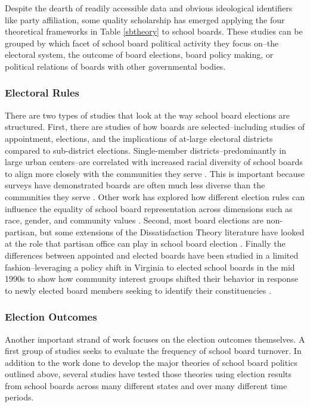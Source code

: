 Despite the dearth of readily accessible data and obvious ideological identifiers like party affiliation, some quality scholarship has emerged applying the four theoretical frameworks in Table \ref{sbtheory} to school boards. These studies can be grouped by which facet of school board political activity they focus on--the electoral system, the outcome of board elections, board policy making, or political relations of boards with other governmental bodies. 

\subsubsection{Electoral Rules}
There are two types of studies that look at the way school board elections are structured. First, there are studies of how boards are selected--including studies of appointment, elections, and the implications of at-large electoral districts compared to sub-district elections. Single-member districts--predominantly in large urban centers--are correlated with increased racial diversity of school boards to align more closely with the communities they serve \citep{RefWorks:195,RefWorks:238}. This is important because surveys have demonstrated boards are often much less diverse than the communities they serve \citep{RefWorks:321,RefWorks:322}. Other work has explored how different election rules can influence the equality of school board representation across dimensions such as race, gender, and community values \citep{RefWorks:241,RefWorks:238}. Second, most board elections are non-partisan, but some extensions of the Dissatisfaction Theory literature have looked at the role that partisan office can play in school board election \citep{RefWorks:273}. Finally the differences between appointed and  elected boards have been studied in a limited fashion--leveraging a policy shift in Virginia to elected school boards in the mid 1990s to show how community interest groups shifted their behavior in response to newly elected board members seeking to identify their constituencies \citep{RefWorks:315,RefWorks:242}. 

\subsubsection{Election Outcomes}
Another important strand of work focuses on the election outcomes themselves. A first group of studies seeks to evaluate the frequency of school board turnover. In addition to the work done to develop the major theories of school board politics outlined above, several studies have tested those theories using election results from school boards across many different states and over many different time periods. 

